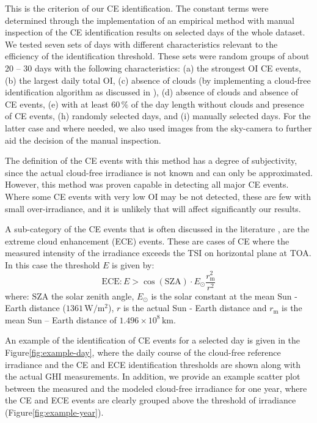 \documentclass[preprint, 5p,
authoryear]{elsarticle} %
\begin{document}
This is the criterion of our CE identification. The constant terms were
determined through the implementation of an empirical method with manual
inspection of the CE identification results on selected days of the
whole dataset. We tested seven sets of days with different
characteristics relevant to the efficiency of the identification
threshold. These sets were random groups of about 20 -- 30 days with the
following characteristics: (a) the strongest OI CE events, (b) the
largest daily total OI, (c) absence of clouds (by implementing a
cloud-free identification algorithm as discussed in \citet{Natsis2023}),
(d) absence of clouds and absence of CE events, (e) with at least
\(60\,\%\) of the day length without clouds and presence of CE events,
(h) randomly selected days, and (i) manually selected days. For the
latter case and where needed, we also used images from the sky-camera to
further aid the decision of the manual inspection.

The definition of the CE events with this method has a degree of
subjectivity, since the actual cloud-free irradiance is not known and
can only be approximated. However, this method was proven capable in
detecting all major CE events. Where some CE events with very low OI may
be not detected, these are few with small over-irradiance, and it is
unlikely that will affect significantly our results.

A sub-category of the CE events that is often discussed in the
literature \citep{Cordero2023, Martins2022, Yordanov2015}, are the
extreme cloud enhancement (ECE) events. These are cases of CE where the
measured intensity of the irradiance exceeds the TSI on horizontal plane
at TOA. In this case the threshold \(E\) is given by: \begin{equation}
\text{ECE}: E > \cos(\text{SZA}) \cdot E_{\odot} \frac{r^2_\text{m}} {r^2}
\label{eq:ECE}
\end{equation} where: \(\text{SZA}\) the solar zenith angle,
\(E_{\odot}\) is the solar constant at the mean Sun - Earth distance
(\(1361\,\text{W}/\text{m}^2\)), \(r\) is the actual Sun - Earth
distance and \(r_\text{m}\) is the mean Sun -- Earth distance of
\(1.496\times10^8\,\text{km}\).

An example of the identification of CE events for a selected day is
given in the Figure\nobreakspace{}\ref{fig:example-day}, where the daily
course of the cloud-free reference irradiance and the CE and ECE
identification thresholds are shown along with the actual GHI
measurements. In addition, we provide an example scatter plot between
the measured and the modeled cloud-free irradiance for one year, where
the CE and ECE events are clearly grouped above the threshold of
irradiance (Figure\nobreakspace{}\ref{fig:example-year}).
\end{document}
